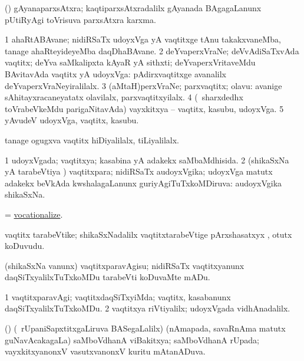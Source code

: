 \bentry
{}
\gl{\nA}
\expl{}
\bmng
 (\saM) gAyanaparxsAtxra; kaqtiparxsAtxradalilx gAyanada BAgagaLanunx pUtiRyAgi toVrisuva parxsAtxra karxma. 
\emng
\eentry

\bentry
{} 
\gl{\nA}
\expl{}
\bmng
\bnum
\num{1} ahaRtABAvane; nidiRSaTx udoyxVga yA vaqtitxge tAnu takakxvaneMba, tanage ahaRteyideyeMba daqDhaBAvane. 
\num{2} deYvaperxVraNe; deVvAdiSaTxvAda vaqtitx; deYva saMkalipxta kAyaR yA sithxti; deYvaperxVritaveMdu BAvitavAda vaqtitx yA udoyxVga:  pAdirxvaqtitxge avanalilx deYvaperxVraNeyiralilalx. 
\num{3} (aMtaH)perxVraNe; parxvaqtitx; olavu:  avanige sAhitayxracaneyatatx olavilalx, parxvaqtitxyilalx. 
\num{4} (\kanmu\ sharxdedhx toVrabeVkeMdu parigaNitavAda) vayxkitxya -- vaqtitx, kasubu, udoyxVga. 
\num{5} yAvudeV udoyxVga, vaqtitx, kasubu. 
\enum
\emng

\noindent 
\gl{\pagu}
\expl{}
\bmng
  tanage ogugxva vaqtitx hiDiyalilalx, tiLiyalilalx. 
\emng
\eentry

\bentry 
{} 
\gl{\gu}
\expl{}
\bmng
\bnum
\num{1} udoyxVgada; vaqtitxya; kasabina yA adakekx saMbaMdhisida. 
\num{2} (shikaSxNa yA tarabeVtiya \vi) vaqtitxpara; nidiRSaTx audoyxVgika; udoyxVga matutx adakekx beVkAda kwshalagaLanunx guriyAgiTuTxkoMDiruva:  audoyxVgika shikaSxNa. 
\enum
\emng
\eentry

\bentry
{} 
\gl{\sakirx}
\expl{}
\bmng
 = \hyperlink{vocationalize}{vocationalize}. 
\emng
\eentry

\bentry 
{} 
\gl{\nA}
\expl{}
\bmng
 vaqtitx tarabeVtike; shikaSxNadalilx vaqtitxtarabeVtige pArxshasatxyx , otutx koDuvudu. 
\emng
\eentry

\bentry
{} 
\gl{\sakirx}
\expl{}
\bmng
 (shikaSxNa \mo vanunx) vaqtitxparavAgisu; nidiRSaTx vaqtitxyanunx daqSiTxyalilxTuTxkoMDu tarabeVti koDuvaMte mADu. 
\emng
\eentry

\bentry
{} 
\gl{\kirxvi}
\expl{}
\bmng
\bnum
\num{1} vaqtitxparavAgi; vaqtitxdaqSiTxyiMda; vaqtitx, kasabanunx daqSiTxyalilxTuTxkoMDu. 
\num{2} vaqtitxya riVtiyalilx; udoyxVgada vidhAnadalilx. 
\enum
\emng
\eentry

\bentry
{} 
\gl{\gu}
\expl{}
\bmng
 (\vAyx) (\kanmu\ rUpaniSapxtitxgaLiruva BASegaLalilx) (nAmapada, savaRnAma matutx guNavAcakagaLa) saMboVdhanA viBakitxya; saMboVdhanA rUpada; vayxkitxyanonxV vasutxvanonxV kuritu mAtanADuva. 
\emng
\eentry


